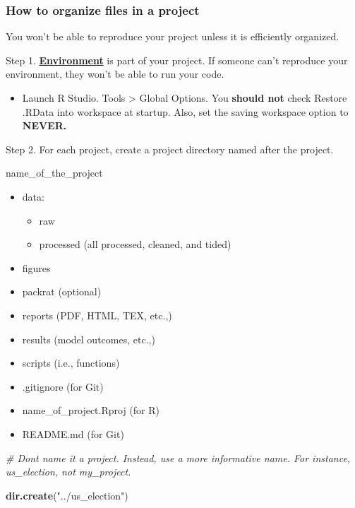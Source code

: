 \documentclass[
]{book}
\newenvironment{Shaded}{\begin{snugshade}}{\end{snugshade}}
\newcommand{\CommentTok}[1]{\textcolor[rgb]{0.56,0.35,0.01}{\textit{#1}}}
\newcommand{\FunctionTok}[1]{\textcolor[rgb]{0.13,0.29,0.53}{\textbf{#1}}}
\newcommand{\NormalTok}[1]{#1}
\newcommand{\StringTok}[1]{\textcolor[rgb]{0.31,0.60,0.02}{#1}}
\providecommand{\tightlist}{%
  \setlength{\itemsep}{0pt}\setlength{\parskip}{0pt}}
\begin{document}
\subsubsection{How to organize files in a project}\label{how-to-organize-files-in-a-project}

You won't be able to reproduce your project unless it is efficiently organized.

Step 1. \href{https://environments.rstudio.com/}{\textbf{Environment}} is part of your project. If someone can't reproduce your environment, they won't be able to run your code.

\begin{itemize}
\tightlist
\item
  Launch R Studio. Tools \textgreater{} Global Options. You \textbf{should not} check Restore .RData into workspace at startup. Also, set the saving workspace option to \textbf{NEVER.}
\end{itemize}

Step 2. For each project, create a project directory named after the project.

name\_of\_the\_project

\begin{itemize}
\tightlist
\item
  data:

  \begin{itemize}
  \tightlist
  \item
    raw
  \item
    processed (all processed, cleaned, and tided)
  \end{itemize}
\item
  figures
\item
  packrat (optional)
\item
  reports (PDF, HTML, TEX, etc.,)
\item
  results (model outcomes, etc.,)
\item
  scripts (i.e., functions)
\item
  .gitignore (for Git)
\item
  name\_of\_project.Rproj (for R)
\item
  README.md (for Git)
\end{itemize}

\begin{Shaded}
\begin{Highlighting}[]
\CommentTok{\# Don\textquotesingle{}t name it a project. Instead, use a more informative name. For instance, \textasciigrave{}us\_election\textasciigrave{}, not \textasciigrave{}my\_project.\textasciigrave{}}

\FunctionTok{dir.create}\NormalTok{(}\StringTok{"../us\_election"}\NormalTok{)}
\end{Highlighting}
\end{Shaded}
\end{document}
